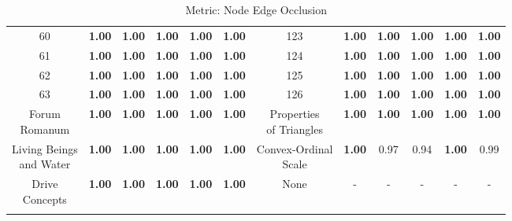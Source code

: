 \documentclass{article}
\begin{document}
{\begin{longtable}{cccccc@{\qquad}cccccc}
60 & \textbf{1.00} & \textbf{1.00} & \textbf{1.00} & \textbf{1.00} & \textbf{1.00} & 123 & \textbf{1.00} & \textbf{1.00} & \textbf{1.00} & \textbf{1.00} & \textbf{1.00} \\
61 & \textbf{1.00} & \textbf{1.00} & \textbf{1.00} & \textbf{1.00} & \textbf{1.00} & 124 & \textbf{1.00} & \textbf{1.00} & \textbf{1.00} & \textbf{1.00} & \textbf{1.00} \\
62 & \textbf{1.00} & \textbf{1.00} & \textbf{1.00} & \textbf{1.00} & \textbf{1.00} & 125 & \textbf{1.00} & \textbf{1.00} & \textbf{1.00} & \textbf{1.00} & \textbf{1.00} \\
63 & \textbf{1.00} & \textbf{1.00} & \textbf{1.00} & \textbf{1.00} & \textbf{1.00} & 126 & \textbf{1.00} & \textbf{1.00} & \textbf{1.00} & \textbf{1.00} & \textbf{1.00} \\
\makecell[c]{Forum \\ Romanum} & \textbf{1.00} & \textbf{1.00} & \textbf{1.00} & \textbf{1.00} & \textbf{1.00} & \makecell[c]{Properties \\ of Triangles} & \textbf{1.00} & \textbf{1.00} & \textbf{1.00} & \textbf{1.00} & \textbf{1.00} \\
\makecell[c]{Living Beings \\ and Water} & \textbf{1.00} & \textbf{1.00} & \textbf{1.00} & \textbf{1.00} & \textbf{1.00} & \makecell[c]{Convex-Ordinal \\ Scale} & \textbf{1.00} & 0.97 & 0.94 & \textbf{1.00} & 0.99 \\
\makecell[c]{Drive \\ Concepts} & \textbf{1.00} & \textbf{1.00} & \textbf{1.00} & \textbf{1.00} & \textbf{1.00} & None & - & - & - & - & - \\
\caption{Metric: Node Edge Occlusion} \\
\end{longtable}
}
\clearpage
\end{document}
